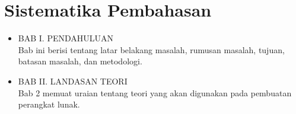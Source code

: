 \section{Sistematika Pembahasan}
\label{sec:sispem}
\begin{itemize}

\item BAB I. PENDAHULUAN\\
Bab ini berisi tentang latar belakang masalah, rumusan
masalah, tujuan, batasan masalah, dan metodologi.
\item BAB II. LANDASAN TEORI\\
Bab 2 memuat uraian tentang teori yang akan digunakan pada pembuatan perangkat lunak.
\end{itemize}

